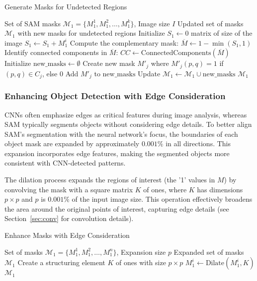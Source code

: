 \begin{algorithm}[ht]
\caption{Generate Masks for Undetected Regions}
\begin{algorithmic}[1]
\Require Set of SAM masks $\mathcal{M}_1 = \{M_1^1, M_1^2, \ldots, M_1^k\}$, Image size $I$
\Ensure Updated set of masks $\mathcal{M}_1$ with new masks for undetected regions
\State Initialize $S_1 \gets 0$ matrix of size of the image
    \State $S_1 \gets S_1 + M_1^i$
\EndFor
\State Compute the complementary mask: $\overline{M} \gets 1 - \min(S_1, 1)$
\State Identify connected components in $\overline{M}$: $CC \gets \text{ConnectedComponents}(\overline{M})$
\State Initialize $\text{new\_masks} \gets \emptyset$
        \State Create new mask $M'_j$ where $M'_j(p, q) = 1$ if $(p, q) \in C_j$, else $0$
        \State Add $M'_j$ to $\text{new\_masks}$
    \EndIf
\EndFor
\State Update $\mathcal{M}_1 \gets \mathcal{M}_1 \cup \text{new\_masks}$
\State \Return $\mathcal{M}_1$
\end{algorithmic}
\end{algorithm}

\subsubsection{Enhancing Object Detection with Edge Consideration}

CNNs often emphasize edges as critical features during image analysis, whereas SAM typically segments objects without considering edge details. To better align SAM's segmentation with the neural network's focus, the boundaries of each object mask are expanded by approximately $0.001\%$ in all directions. This expansion incorporates edge features, making the segmented objects more consistent with CNN-detected patterns.

The dilation process expands the regions of interest (the '1' values in $M$) by convolving the mask with a square matrix $K$ of ones, where $K$ has dimensions $p \times p$ and $p$ is $0.001\%$ of the input image size. This operation effectively broadens the area around the original points of interest, capturing edge details (see Section~\ref{sec:conv} for convolution details).

\begin{algorithm}[H]
\caption{Enhance Masks with Edge Consideration}
\begin{algorithmic}[1]
\Require Set of masks $\mathcal{M}_1 = \{M_1^1, M_1^2, \ldots, M_1^n\}$, Expansion size $p$
\Ensure Expanded set of masks $\mathcal{M}_1$
\State Create a structuring element $K$ of ones with size $p \times p$
    \State $M_1^i \gets \text{Dilate}(M_1^i, K)$
\EndFor
\State \Return $\mathcal{M}_1$
\end{algorithmic}
\end{algorithm}


